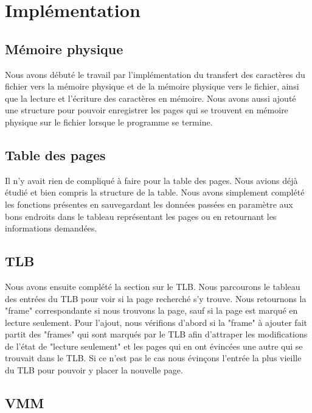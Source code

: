\documentclass{article}
\begin{document}
\section{Implémentation}

\subsection{Mémoire physique}

Nous avons débuté le travail par l'implémentation du transfert des caractères 
du fichier vers la mémoire physique et de la mémoire physique vers le fichier, 
ainsi que la lecture et l'écriture des caractères en mémoire. Nous avons aussi 
ajouté une structure pour pouvoir enregistrer les pages qui se trouvent en 
mémoire physique sur le fichier lorsque le programme se termine.

\subsection{Table des pages}

Il n'y avait rien de compliqué à faire pour la table des pages. Nous avions 
déjà étudié et bien compris la structure de la table. Nous avons simplement 
complété les fonctions présentes en sauvegardant les données passées en 
paramètre aux bons endroits dans le tableau représentant les pages ou en 
retournant les informations demandées.

\subsection{TLB}

Nous avons ensuite complété la section sur le TLB. Nous parcourons le tableau 
des entrées du TLB pour voir si la page recherché s'y trouve. Nous retournons 
la "frame" correspondante si nous trouvons la page, sauf si la page est marqué 
en lecture seulement. Pour l'ajout, nous vérifions d'abord si la "frame" à 
ajouter fait partit des "frames" qui sont marqués par le TLB afin d'attraper 
les modifications de l'état de "lecture seulement" et les pages qui en ont 
évincées une autre qui se trouvait dans le TLB. Si ce n'est pas le cas nous 
évinçons l'entrée la plus vieille du TLB pour pouvoir y placer la nouvelle 
page.

\subsection{VMM}
\end{document}
